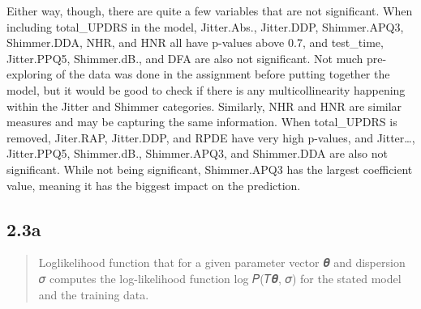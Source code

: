 \documentclass[
]{article}
\begin{document}
Either way, though, there are quite a few variables that are not
significant. When including total\_UPDRS in the model, Jitter.Abs.,
Jitter.DDP, Shimmer.APQ3, Shimmer.DDA, NHR, and HNR all have p-values
above 0.7, and test\_time, Jitter.PPQ5, Shimmer.dB., and DFA are also
not significant. Not much pre-exploring of the data was done in the
assignment before putting together the model, but it would be good to
check if there is any multicollinearity happening within the Jitter and
Shimmer categories. Similarly, NHR and HNR are similar measures and may
be capturing the same information. When total\_UPDRS is removed,
Jiter.RAP, Jitter.DDP, and RPDE have very high p-values, and
Jitter\ldots, Jitter.PPQ5, Shimmer.dB., Shimmer.APQ3, and Shimmer.DDA
are also not significant. While not being significant, Shimmer.APQ3 has
the largest coefficient value, meaning it has the biggest impact on the
prediction.

\hypertarget{a}{%
\subsection{2.3a}\label{a}}

\begin{quote}
Loglikelihood function that for a given parameter vector 𝜽 and
dispersion 𝜎 computes the log-likelihood function log 𝑃(𝑇\textbar 𝜽, 𝜎)
for the stated model and the training data.
\end{quote}
\end{document}
